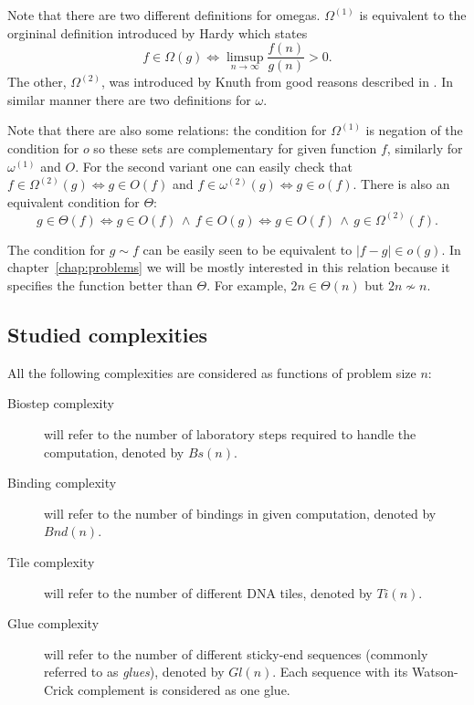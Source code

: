 		\begin{remark}
			Note that there are two different definitions for omegas. $\Omega^{(1)}$ is equivalent to the orgininal definition introduced by Hardy \cite{hardy1914} which states
			\begin{equation}
				f \in \Omega(g) \iff \limsup\limits_{n\to\infty}\frac{f(n)}{g(n)} > 0 .
			\end{equation}
			The other, $\Omega^{(2)}$, was introduced by Knuth from good reasons described in \cite{knuth76}. In similar manner there are two definitions for $\omega$.
			
			Note that there are also some relations: the condition for $\Omega^{(1)}$ is negation of the condition for $o$ so these sets are complementary for given function $f$, similarly for $\omega^{(1)}$ and $O$. For the second variant one can easily check that $f\in\Omega^{(2)}(g)\iff g\in O(f)$ and $f\in\omega^{(2)}(g)\iff g\in o(f)$. There is also an equivalent condition for $\Theta$:
			\begin{equation}
				g \in \Theta(f) \iff g \in O(f) \,\wedge\, f \in O(g) \iff g \in O(f) \,\wedge\, g \in \Omega^{(2)}(f) .
			\end{equation}
			
			The condition for $g \sim f$ can be easily seen to be equivalent to $|f-g| \in o(g)$. In chapter~\ref{chap:problems} we will be mostly interested in this relation because it specifies the function better than $\Theta$. For example, $2n \in \Theta(n)$ but $2n \not\sim n$.
		\end{remark}
	
	\subsection{Studied complexities}
		
		\begin{defn}
			All the following complexities are considered as functions of problem size $n$:
			\begin{description}
				\item[Biostep complexity] will refer to the number of laboratory steps required to handle the computation, denoted by $Bs(n)$.
				\item[Binding complexity] will refer to the number of bindings in given computation, denoted by $Bnd(n)$.
				\item[Tile complexity] will refer to the number of different DNA tiles, denoted by $Ti(n)$.
				\item[Glue complexity] will refer to the number of different sticky-end sequences (commonly referred to as {\em glues}), denoted by $Gl(n)$. Each sequence with its Watson-Crick complement is considered as one glue.
			\end{description}
		\end{defn}
		
